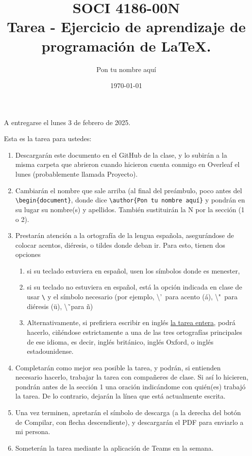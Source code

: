 \documentclass[11pt]{article} %
\title{SOCI 4186-00N \\ Tarea \textnumero 1 - Ejercicio de aprendizaje de programaci\'on de \LaTeX.}
\author{Pon tu nombre aquí}
\date{\today}
\begin{document}
\maketitle
\begin{center}
   A entregarse el lunes 3 de febrero de 2025. 
\end{center}

Esta es la tarea para ustedes: 
\begin{enumerate}
    \item Descargarán este documento en el GitHub de la clase, y lo subirán a la misma carpeta que abrieron cuando hicieron cuenta conmigo en Overleaf el lunes (probablemente llamada Proyecto).
    \item Cambiarán el nombre que sale arriba (al final del preámbulo, poco antes del \texttt{\textbackslash begin\{document\}}, donde dice \texttt{\textbackslash author\{Pon tu nombre aquí\}} y pondrán en su lugar su nombre(s) y apellidos. También sustituirán la N por la sección (1 o 2).
    \item Prestarán atención a la ortografía de la lengua española, asegurándose de colocar acentos, diéresis, o tildes donde deban ir. Para esto, tienen dos opciones 
    \begin{enumerate}
        \item si su teclado estuviera en español, usen los símbolos donde es menester,
        \item si su teclado no estuviera en español, está la opción indicada en clase de usar \texttt{\textbackslash} y el símbolo necesario (por ejemplo, \textbackslash'\ para acento (\'a), \textbackslash "\  para diéresis (\"u), \textbackslash \~\ para \~n)
        \item Alternativamente, si prefiriera escribir en inglés \underline{la tarea entera}, podrá hacerlo, ciñéndose estrictamente a una de las tres ortografías principales de ese idioma, es decir, inglés británico, inglés Oxford, o inglés estadounidense.
    \end{enumerate}
    \item Completarán como mejor sea posible la tarea, y podrán, si entienden necesario hacerlo, trabajar la tarea con compañeres de clase. Si así lo hicieren, pondrán antes de la sección 1 una oración indicándome con quién(es) trabajó la tarea. De lo contrario, dejarán la línea que está actualmente escrita.
    \item  Una vez terminen, apretarán el símbolo de descarga (a la derecha del botón de Compilar, con flecha descendiente), y descargarán el PDF para enviarlo a mi persona.
    \item Someterán la tarea mediante la aplicación de Teams en la semana.
\end{enumerate}
\end{document}
